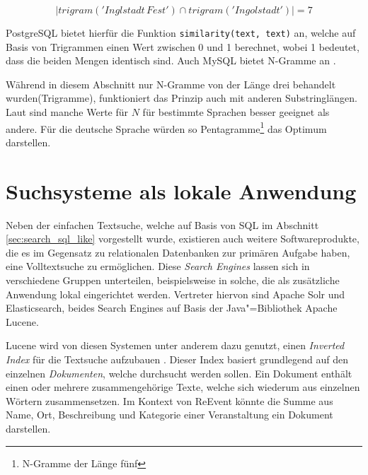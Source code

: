 \begin{equation}
\left\vert{trigram('Inglstadt\,Fest') \cap trigram('Ingolstadt')}\right\vert = 7
\end{equation}

PostgreSQL bietet hierfür die Funktion \texttt{similarity(text, text)} an, welche auf Basis von Trigrammen einen Wert zwischen 0 und 1 berechnet, wobei 1 bedeutet, dass die beiden Mengen identisch sind. Auch MySQL bietet N-Gramme an \cite{OracleCorporationandoritsaffiliates.2015}.

Während in diesem Abschnitt nur N-Gramme von der Länge drei behandelt wurden(Trigramme), funktioniert das Prinzip auch mit anderen Substringlängen. Laut \cite[S. 95]{Buttcher.2010} sind manche Werte für $N$ für bestimmte Sprachen besser geeignet als andere. Für die deutsche Sprache würden so Pentagramme\footnote{N-Gramme der Länge fünf} das Optimum darstellen.

\section{Suchsysteme als lokale Anwendung}
\label{sec:market_solr}

Neben der einfachen Textsuche, welche auf Basis von SQL im Abschnitt \ref{sec:search_sql_like} vorgestellt wurde, existieren auch weitere Softwareprodukte, die es im Gegensatz zu relationalen Datenbanken zur primären Aufgabe haben, eine Volltextsuche zu ermöglichen. Diese \emph{Search Engines} lassen sich in verschiedene Gruppen unterteilen, beispielsweise in solche, die als zusätzliche Anwendung lokal eingerichtet werden. Vertreter hiervon sind Apache Solr und Elasticsearch, beides Search Engines auf Basis der Java"=Bibliothek Apache Lucene.

Lucene wird von diesen Systemen unter anderem dazu genutzt, einen \emph{Inverted Index} für die Textsuche aufzubauen \cite[S. 11]{Grainger.2014}. Dieser Index basiert grundlegend auf den einzelnen \emph{Dokumenten}, welche durchsucht werden sollen. Ein Dokument enthält einen oder mehrere zusammengehörige Texte, welche sich wiederum aus einzelnen Wörtern zusammensetzen. Im Kontext von ReEvent könnte die Summe aus Name, Ort, Beschreibung und Kategorie einer Veranstaltung ein Dokument darstellen.

